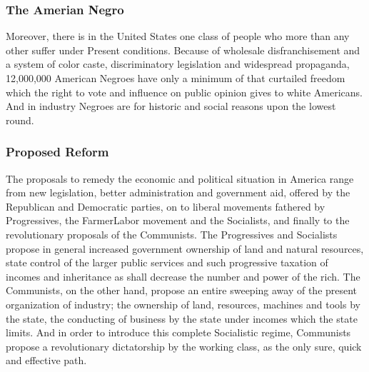 \documentclass[letterpaper,10pt,english]{jupyterBook}
\begin{document}
\subsubsection{The Amerian Negro}
\label{\detokenize{Volumes/38/09/negro_and_communism:the-amerian-negro}}
\sphinxAtStartPar
Moreover, there is in the United States one class of people who more than any other suffer under Present conditions. Because of wholesale disfranchisement and a system of color caste, discriminatory legislation and widespread propaganda, 12,000,000 American Negroes have only a minimum of that curtailed freedom which the right to vote and influence on public opinion gives to white Americans. And in industry Negroes are for historic and social reasons upon the lowest round.


\subsubsection{Proposed Reform}
\label{\detokenize{Volumes/38/09/negro_and_communism:proposed-reform}}
\sphinxAtStartPar
The proposals to remedy the economic and political situation in America range from new legislation, better administration and government aid, offered by the Republican and Democratic parties, on to liberal movements fathered by Progressives, the Farmer\sphinxhyphen{}Labor movement and the Socialists, and finally to the revolutionary proposals of the Communists. The Progressives and Socialists propose in general increased government ownership of land and natural resources, state control of the larger public services and such progressive taxation of incomes and inheritance as shall decrease the number and power of the rich. The Communists, on the other hand, propose an entire sweeping away of the present organization of industry; the ownership of land, resources, machines and tools by the state, the conducting of business by the state under incomes which the state limits. And in order to introduce this complete Socialistic regime, Communists propose a revolutionary dictatorship by the working class, as the only sure, quick and effective path.
\end{document}
